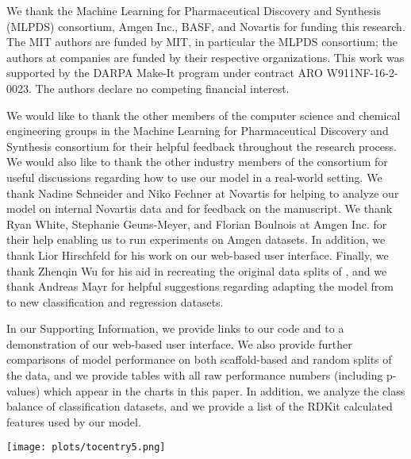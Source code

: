 \documentclass[journal=jcisd8,manuscript=article]{achemso}
\begin{document}
\begin{acknowledgement}

We thank the Machine Learning for Pharmaceutical Discovery and Synthesis (MLPDS) consortium, Amgen Inc., BASF, and Novartis for funding this research. The MIT authors are funded by MIT, in particular the MLPDS consortium; the authors at companies are funded by their respective organizations. This work was supported by the DARPA Make-It program under contract ARO W911NF-16-2-0023. The authors declare no competing financial interest.

We would like to thank the other members of the computer science and chemical engineering groups in the Machine Learning for Pharmaceutical Discovery and Synthesis consortium for their helpful feedback throughout the research process. We would also like to thank the other industry members of the consortium for useful discussions regarding how to use our model in a real-world setting. We thank Nadine Schneider and Niko Fechner at Novartis for helping to analyze our model on internal Novartis data and for feedback on the manuscript. We thank Ryan White, Stephanie Geuns-Meyer, and Florian Boulnois at Amgen Inc. for their help enabling us to run experiments on Amgen datasets. In addition, we thank Lior Hirschfeld for his work on our web-based user interface\cite{chemprop_website}. Finally, we thank Zhenqin Wu for his aid in recreating the original data splits of \citeauthor{Wu_2018}\cite{Wu_2018}, and we thank Andreas Mayr for helpful suggestions regarding adapting the model from \citeauthor{mayr2018chembl}\cite{mayr2018chembl} to new classification and regression datasets. 

\end{acknowledgement}

\begin{suppinfo}

In our Supporting Information, we provide links to our code and to a demonstration of our web-based user interface. We also provide further comparisons of model performance on both scaffold-based and random splits of the data, and we provide tables with all raw performance numbers (including p-values) which appear in the charts in this paper. In addition, we analyze the class balance of classification datasets, and we provide a list of the RDKit calculated features used by our model.

\end{suppinfo}







\begin{tocentry}

\centering
\texttt{[image: plots/tocentry5.png]}

\end{tocentry}
\end{document}
